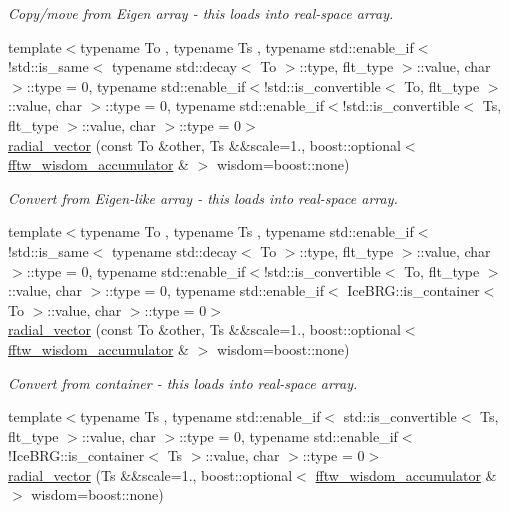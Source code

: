 \begin{DoxyCompactItemize}
\begin{DoxyCompactList}\small\item\em Copy/move from Eigen array -\/ this loads into real-\/space array. \end{DoxyCompactList}\item 
{\footnotesize template$<$typename To , typename Ts , typename std\+::enable\+\_\+if$<$!std\+::is\+\_\+same$<$ typename std\+::decay$<$ To $>$\+::type, flt\+\_\+type $>$\+::value, char $>$\+::type  = 0, typename std\+::enable\+\_\+if$<$!std\+::is\+\_\+convertible$<$ To, flt\+\_\+type $>$\+::value, char $>$\+::type  = 0, typename std\+::enable\+\_\+if$<$!std\+::is\+\_\+convertible$<$ Ts, flt\+\_\+type $>$\+::value, char $>$\+::type  = 0$>$ }\\\hyperlink{classIceBRG_1_1Fourier_1_1radial__vector_adab57e66cf0e4d3bf4430430f4388ad3}{radial\+\_\+vector} (const To \&other, Ts \&\&scale=1., boost\+::optional$<$ \hyperlink{classIceBRG_1_1Fourier_1_1fftw__wisdom__accumulator}{fftw\+\_\+wisdom\+\_\+accumulator} \& $>$ wisdom=boost\+::none)
\begin{DoxyCompactList}\small\item\em Convert from Eigen-\/like array -\/ this loads into real-\/space array. \end{DoxyCompactList}\item 
{\footnotesize template$<$typename To , typename Ts , typename std\+::enable\+\_\+if$<$!std\+::is\+\_\+same$<$ typename std\+::decay$<$ To $>$\+::type, flt\+\_\+type $>$\+::value, char $>$\+::type  = 0, typename std\+::enable\+\_\+if$<$!std\+::is\+\_\+convertible$<$ To, flt\+\_\+type $>$\+::value, char $>$\+::type  = 0, typename std\+::enable\+\_\+if$<$ Ice\+B\+R\+G\+::is\+\_\+container$<$ To $>$\+::value, char $>$\+::type  = 0$>$ }\\\hyperlink{classIceBRG_1_1Fourier_1_1radial__vector_adab57e66cf0e4d3bf4430430f4388ad3}{radial\+\_\+vector} (const To \&other, Ts \&\&scale=1., boost\+::optional$<$ \hyperlink{classIceBRG_1_1Fourier_1_1fftw__wisdom__accumulator}{fftw\+\_\+wisdom\+\_\+accumulator} \& $>$ wisdom=boost\+::none)
\begin{DoxyCompactList}\small\item\em Convert from container -\/ this loads into real-\/space array. \end{DoxyCompactList}\item 
{\footnotesize template$<$typename Ts , typename std\+::enable\+\_\+if$<$ std\+::is\+\_\+convertible$<$ Ts, flt\+\_\+type $>$\+::value, char $>$\+::type  = 0, typename std\+::enable\+\_\+if$<$!\+Ice\+B\+R\+G\+::is\+\_\+container$<$ Ts $>$\+::value, char $>$\+::type  = 0$>$ }\\\hyperlink{classIceBRG_1_1Fourier_1_1radial__vector_aabe6f95ba0ccd95675d43fc6d0ff0f2a}{radial\+\_\+vector} (Ts \&\&scale=1., boost\+::optional$<$ \hyperlink{classIceBRG_1_1Fourier_1_1fftw__wisdom__accumulator}{fftw\+\_\+wisdom\+\_\+accumulator} \& $>$ wisdom=boost\+::none)

\end{DoxyCompactItemize}
